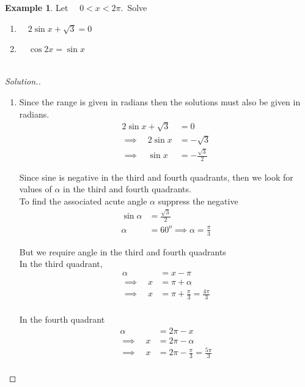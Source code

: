 \documentclass[11pt,a4paper]{article}
\theoremstyle{definition}
\newtheorem{example}[thm]{Example}
\newenvironment{solution}
  {\renewcommand{\qedsymbol}{}\begin{proof}[\textit{Solution}.]}
  {\end{proof}}
\begin{document}
\begin{example}

Let $\quad  0 < x < 2\pi.\,$ Solve
\begin{enumerate}
\item[i.] $\quad  2\sin x + \sqrt{3} = 0$

\item[ii.] $\quad  \cos 2x = \sin x$\\\\
\end{enumerate}
\end{example}
\begin{solution}

\begin{enumerate}
\item[i.]  Since the range is given in radians then the solutions must also be given in radians.
\begin{align*}
2\sin x + \sqrt{3} & = 0\\
\implies \quad  2\sin x & = - \sqrt{3}\\
\implies \quad  \sin x & = -\frac{\sqrt{3}}{2}
\end{align*}


Since sine is negative in the third and fourth quadrants, then we look for values of $\alpha$ in the third and fourth quadrants.\\
To find the associated acute angle $\alpha$ suppress the negative
\begin{align*}
\sin \alpha & = \frac{\sqrt{3}}{2}\\
\alpha & = 60^o \implies \alpha = \frac{\pi}{3}
\end{align*}

But we require angle in the third and fourth quadrants\\

In the third quadrant, 
\begin{align*}
\alpha & = x - \pi\\
\implies\quad  x &  = \pi + \alpha \\
\implies\quad  x & = \pi + \frac{\pi}{3} = \frac{4\pi}{3}\\
\end{align*}

In the fourth quadrant
\begin{align*}
\alpha & = 2\pi - x\\
\implies\quad  x & = 2\pi - \alpha\\
\implies \quad  x & = 2\pi - \frac{\pi}{3} = \frac{5\pi}{3}\\
\end{align*}





\end{enumerate}
\end{solution}
\end{document}
